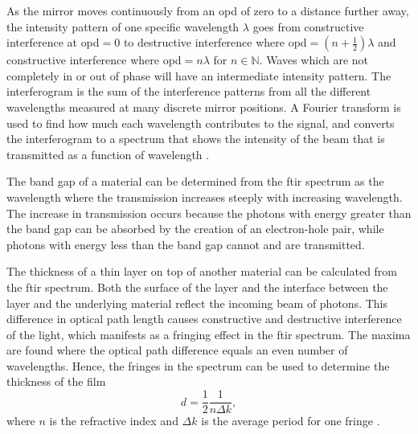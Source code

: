 As the mirror moves continuously from an \ac{opd} of zero to a distance further away, the intensity pattern of one specific wavelength $\lambda$ goes from constructive interference at \ac{opd}$=0$ to destructive interference where \ac{opd}$=(n+\frac{1}{2}) \lambda$ and constructive interference where \ac{opd}$= n \lambda$ for $n\in\mathbb{N}$. Waves which are not completely in or out of phase will have an intermediate intensity pattern. The interferogram is the sum of the interference patterns from all the different wavelengths measured at many discrete mirror positions. A Fourier transform is used to find how much each wavelength contributes to the signal, and converts the interferogram to a spectrum that shows the intensity of the beam that is transmitted as a function of wavelength \citep{smith2011fourier}.

%
%
The band gap of a material can be determined from the \ac{ftir} spectrum as the wavelength where the transmission increases steeply with increasing wavelength. The increase in transmission occurs because the photons with energy greater than the band gap can be absorbed by the creation of an electron-hole pair, while photons with energy less than the band gap cannot and are transmitted.

The thickness of a thin layer on top of another material can be calculated from the \ac{ftir} spectrum. Both the surface of the layer and the interface between the layer and the underlying material reflect the incoming beam of photons. This difference in optical path length causes constructive and destructive interference of the light, which manifests as a fringing effect in the \ac{ftir} spectrum. The maxima are found where the optical path difference equals an even number of wavelengths. Hence, the fringes in the spectrum can be used to determine the thickness of the film
\begin{equation}
\label{eq:ftir_thickness}
d = \frac{1}{2}\frac{1}{n\Delta k},
\end{equation}
where $n$ is the refractive index and $\Delta k$ is the average period for one fringe \citep{griffiths2007fourier, stuart2008modern}.
%

